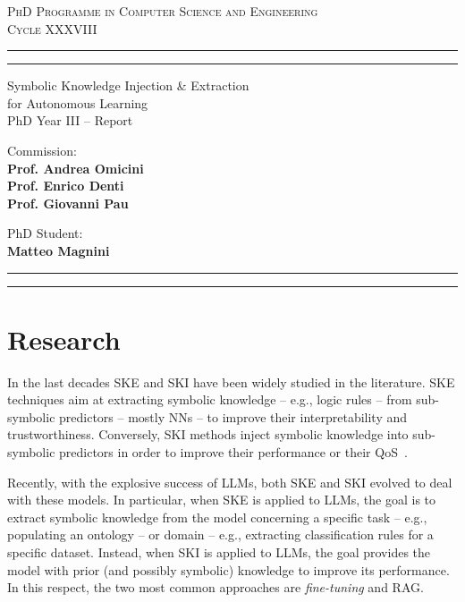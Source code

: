 \documentclass[11pt]{article}
\begin{document}
\sloppy
\begin{center}
	{{
		\Large{
			\textsc{PhD Programme in Computer Science and Engineering \\ 
			\vspace{4mm}
			Cycle XXXVIII}
			}
	}} 
	\rule[0.1cm]{\textwidth}{0.1mm}
	\rule[0.4cm]{\textwidth}{0.6mm}
\end{center}

\begin{center}
	{\LARGE{Symbolic Knowledge Injection \& Extraction\\ for Autonomous Learning}} \\
	\vspace{4mm}
	{\large{PhD Year III -- Report}}
	\vspace{4mm}
\end{center}
\vspace{8mm}
\par
\noindent
\begin{minipage}[t]{0.47\textwidth}

{\large{Commission: \\\bf
Prof. Andrea Omicini \\
Prof. Enrico Denti \\
Prof. Giovanni Pau}
}
\end{minipage}
\hfill
\begin{minipage}[t]{0.47\textwidth}
	\raggedleft
	{
		\large{PhD Student: \\\bf Matteo Magnini}
	}
\end{minipage}
\vspace{10mm}

{
	\raggedright
	\rule[0.1cm]{\textwidth}{0.6mm}
	\rule[0.5cm]{\textwidth}{0.1mm}
}

\newcommand{\rev}[1]{{
	#1
	}}
\section{Research}\label{sec:research}
%
In the last decades \gls{SKE} and \gls{SKI} have been widely studied in the literature.
%
\gls{SKE} techniques aim at extracting symbolic knowledge -- e.g., logic rules -- from sub-symbolic predictors -- mostly \glspl{NN} -- to improve their interpretability and trustworthiness.
%
Conversely, \gls{SKI} methods inject symbolic knowledge into sub-symbolic predictors in order to improve their performance or their \gls{QoS}~\cite{DBLP:journals/aamas/AgiolloRMCO23}.


Recently, with the explosive success of \glspl{LLM}, both \gls{SKE} and \gls{SKI} evolved to deal with these models.
%
In particular, when \gls{SKE} is applied to \glspl{LLM}, the goal is to extract symbolic knowledge from the model concerning a specific task -- e.g., populating an ontology -- or domain -- e.g., extracting classification rules for a specific dataset.
%
Instead, when \gls{SKI} is applied to \glspl{LLM}, the goal provides the model with prior (and possibly symbolic) knowledge to improve its performance.
%
In this respect, the two most common approaches are \emph{fine-tuning} and \gls{RAG}.
\end{document}
